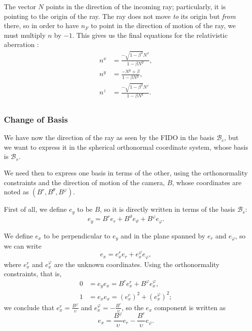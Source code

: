 The vector $N$ points in the direction of the incoming ray; particularly, it is pointing to the origin of the ray. The ray does not move \emph{to} its origin but \emph{from} there, so in order to have $n_F$ to point in the direction of motion of the ray, we must multiply $n$ by $-1$. This gives us the final equations for the relativistic aberration \cite[Eq. (A.9)]{thorne15}:
\begin{align}
n^x &= \frac{-\sqrt{1 - \beta^2}N^x}{1 - \beta N^y}, \\
n^y &= \frac{- N^y + \beta}{1 - \beta N^y}, \\
n^z &= \frac{-\sqrt{1 - \beta^2} N^z}{1 - \beta N^y}. \\
\end{align}

\subsubsection*{Change of Basis}

We have now the direction of the ray as seen by the \ac{FIDO} in the basis $\mathcal{B}_c$, but we want to express it in the spherical orthonormal coordinate system, whose basis is $\mathcal{B}_s$.

We need then to express one basis in terms of the other, using the orthonormality constraints and the direction of motion of the camera, $B$, whose coordinates are noted as $(B^r, B^\theta, B^\varphi)$.

First of all, we define $e_y$ to be $B$, so it is directly written in terms of the basis $\mathcal{B}_s$:
\begin{equation}
\label{eq:changey}
e_y = B^r e_r + B^\vartheta e_\vartheta + B^\varphi e_\varphi.
\end{equation}

We define $e_x$ to be perpendicular to $e_y$ and in the plane spanned by $e_r$ and $e_\varphi$, so we can write
\begin{equation*}
e_x = e_x^r e_r + e_x^\varphi e_\varphi,
\end{equation*}
where $e_x^r$ and $e_x^\varphi$ are the unknown coordinates. Using the orthonormality constraints, that is,
\begin{align*}
0 &= e_y e_x = B^r e_x^r + B^\varphi e_x^\varphi, \\
1 &= e_x e_x = \left( e_x^r \right)^2 + \left(e_x^\varphi\right)^2;
\end{align*}
we conclude that $e_x^r = \frac{B^\varphi}{\upsilon}$ and  $e_x^\varphi = -\frac{B^r}{\upsilon}$, so the $e_x$ component is written as
\begin{equation}
\label{eq:changex}
e_x = \frac{B^\varphi}{\upsilon} e_r - \frac{B^r}{\upsilon} e_\varphi.
\end{equation}

